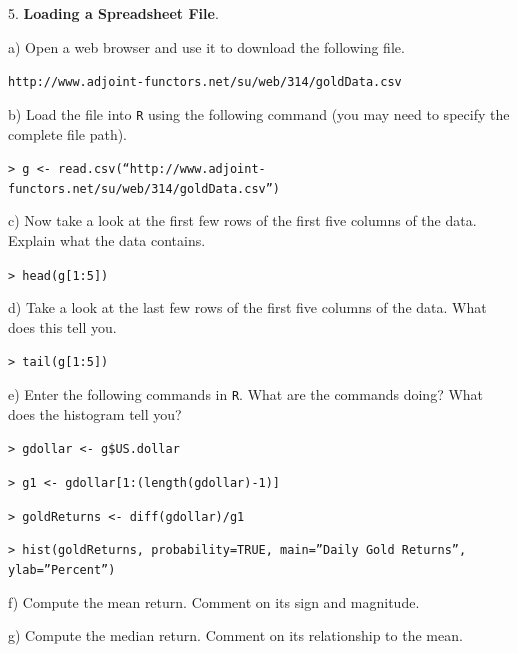 \documentclass[10pt]{article}
\begin{document}
5. \textbf{Loading a Spreadsheet File}.

\HX a) Open a web browser and use it to download the following file.
\begin{center}
\texttt{http://www.adjoint-functors.net/su/web/314/goldData.csv}
\end{center}

\HX b) Load the file into  \texttt{R} using the following command
(you may need to specify the complete file path).


\HX\HX \texttt{> g <- read.csv(``http://www.adjoint-functors.net/su/web/314/goldData.csv'')}

\HX c) Now take a look at the first few rows of the first five columns of the data.
Explain what the data contains.

\HX\HX \texttt{>  head(g[1:5])}

\HX d)  Take a look at the last few rows of the first five columns of the data.
What does this tell you.

\HX\HX \texttt{>  tail(g[1:5])}

\HX e) Enter the following commands in \texttt{R}.  What are the commands doing?
What does the histogram tell you?

\HX\HX \texttt{>  gdollar <- g\$US.dollar}

\HX\HX \texttt{>  g1 <- gdollar[1:(length(gdollar)-1)]}

\HX\HX \texttt{>  goldReturns <- diff(gdollar)/g1}

\HX\HX \texttt{>  hist(goldReturns, probability=TRUE, main=''Daily Gold Returns'', ylab=''Percent'')}

\HX\HX f) Compute the mean return.  Comment on its sign and magnitude.

\HX\HX g) Compute the median return.  Comment on its relationship to the mean.
\vfill
\eject
\end{document}
